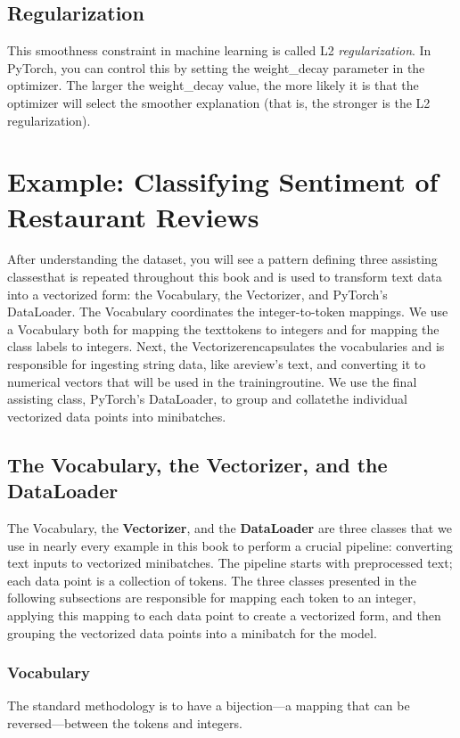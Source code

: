 \subsection{Regularization}
This smoothness constraint in machine learning is called L2 \textit{regularization}. In
PyTorch, you can control this by setting the weight\_decay parameter in the optimizer. The larger the weight\_decay value, the more likely it is that the optimizer will
select the smoother explanation (that is, the stronger is the L2 regularization).

\section{Example: Classifying Sentiment of Restaurant Reviews}
After understanding the dataset, you will see a pattern defining three assisting classesthat is repeated throughout this book and is used to transform text data into a vectorized form: the \textsf{Vocabulary}, the \textsf{Vectorizer}, and PyTorch's \textsf{DataLoader}. The Vocabulary coordinates the integer-to-token mappings. We use a Vocabulary both for mapping the texttokens to integers and for mapping the class labels to integers. Next, the Vectorizerencapsulates the vocabularies and is responsible for ingesting string data, like areview's text, and converting it to numerical vectors that will be used in the trainingroutine. We use the final assisting class, PyTorch's DataLoader, to group and collatethe individual vectorized data points into minibatches.

\subsection{The Vocabulary, the Vectorizer, and the DataLoader}
The \textsf{Vocabulary}, the \textbf{Vectorizer}, and the \textbf{DataLoader}  are three classes that we use in nearly every example in this book to perform a crucial pipeline: converting text inputs to vectorized minibatches. The pipeline starts with preprocessed text; each data point is a collection of tokens. The three classes presented in the following subsections are responsible for mapping each token to an integer, applying this mapping to each data point to create a vectorized form, and then grouping the vectorized data points into a minibatch for the model.
\subsubsection*{Vocabulary}
The standard methodology is to have a bijection—a mapping that can be reversed—between the tokens and integers.

